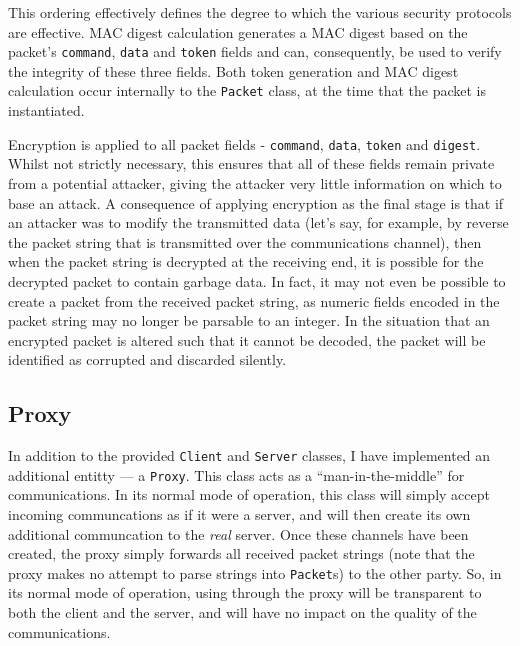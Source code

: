 \documentclass[a4paper,11pt]{article}
\begin{document}
This ordering effectively defines the degree to which the various security 
protocols are effective. MAC digest calculation generates a MAC digest based on
the packet's \verb+command+, \verb+data+ and \verb+token+ fields and can, 
consequently, be used to verify the integrity of these three fields. Both 
token generation and MAC digest calculation occur internally to the 
\verb+Packet+ class, at the time that the packet is instantiated.

Encryption is applied to all packet fields - \verb+command+, \verb+data+, 
\verb+token+ and \verb+digest+. Whilst not strictly necessary, this ensures that
all of these fields remain private from a potential attacker, giving the 
attacker very little information on which to base an attack. A consequence of 
applying encryption as the final stage is that if an attacker was to modify the
transmitted data (let's say, for example, by reverse the packet string that is 
transmitted over the communications channel), then when the packet string is 
decrypted at the receiving end, it is possible for the decrypted packet to 
contain garbage data. In fact, it may not even be possible to create a packet
from the received packet string, as numeric fields encoded in the packet string
may no longer be parsable to an integer. In the situation that an encrypted 
packet is altered such that it cannot be decoded, the packet will be identified
as corrupted and discarded silently.

\subsection{Proxy}
In addition to the provided \serviceName{} \verb+Client+ and \verb+Server+ 
classes, I have implemented an additional \serviceName{} entitty --- a 
\serviceName{} \verb+Proxy+. This class acts as a ``man-in-the-middle'' for
\serviceName{} communications. In its normal mode of operation, this class will
simply accept incoming \serviceName{} communcations as if it were a 
\serviceName{} server, and will then create its own additional \serviceName{}
communcation to the \emph{real} \serviceName{} server. Once these channels have
been created, the proxy simply forwards all received packet strings (note that 
the proxy makes no attempt to parse strings into \verb+Packet+s) to the other
party. So, in its normal mode of operation, using \serviceName{} through the
proxy will be transparent to both the client and the server, and will have no
impact on the quality of the communications.
\end{document}
